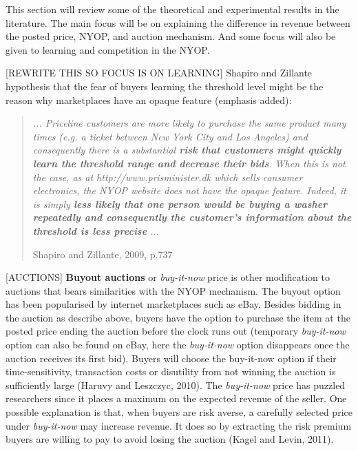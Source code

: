 \documentclass[a4paper,12pt]{article}
\makeatletter
\newcommand\fix{%
  \let\set@color\beamerorig@set@color
  \let\reset@color\beamerorig@reset@color}
\makeatother
\begin{document}
This section will review some of the theoretical and experimental results in the literature. The main focus will be on explaining the difference in revenue between the posted price, NYOP, and auction mechanism. And some focus will also be given to learning and competition in the NYOP.


[REWRITE THIS SO FOCUS IS ON LEARNING]
Shapiro and Zillante hypothesis that the fear of buyers learning the threshold level might be the reason why marketplaces have an opaque feature (emphasis added):
\blockquote[Shapiro and Zillante, 2009, p.737]{\emph{ ... Priceline customers are more likely to purchase the same product many times (e.g. a ticket between New York City and Los Angeles) and consequently there is a substantial \emph{\bf risk that customers might quickly learn the threshold range and decrease their bids}. When this is not the case, as at http://www.prisminister.dk which sells consumer electronics, the NYOP website does not have the opaque feature. Indeed, it is simply \emph{\bf less likely that one person would be buying a washer repeatedly and consequently the customer's information about the threshold is less precise} ...}}

[AUCTIONS]
{\bf Buyout auctions} or {\it buy-it-now} price is other modification to auctions that bears similarities with the NYOP mechanism. The buyout option has been popularised by internet marketplaces such as eBay. Besides bidding in the auction as describe above, buyers have the option to purchase the item at the posted price ending the auction before the clock runs out (temporary {\it buy-it-now} option can also be found on eBay, here the {\it buy-it-now} option disappears once the auction receives its first bid). Buyers will choose the buy-it-now option if their time-sensitivity, transaction costs or disutility from not winning the auction is sufficiently large (Haruvy and Leszczyc, 2010). The {\it buy-it-now} price has puzzled researchers since it places a maximum on the expected revenue of the seller. One possible explanation is that, when buyers are risk averse, a carefully selected price under {\it buy-it-now} may increase revenue. It does so by extracting the risk premium buyers are willing to pay to avoid losing the auction (Kagel and Levin, 2011).
\end{document}
